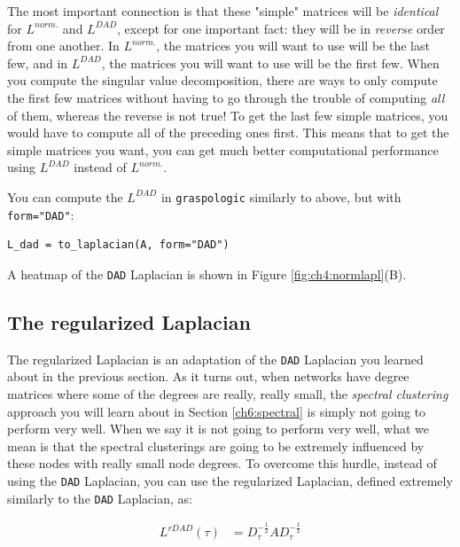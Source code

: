 The most important connection is that these "simple" matrices will be \emph{identical} for $L^{norm.}$ and $L^{DAD}$, except for one important fact: they will be in \emph{reverse} order from one another. In $L^{norm.}$, the matrices you will want to use will be the last few, and in $L^{DAD}$, the matrices you will want to use will be the first few. When you compute the singular value decomposition, there are ways to only compute the first few matrices without having to go through the trouble of computing \emph{all} of them, whereas the reverse is not true! To get the last few simple matrices, you would have to compute all of the preceding ones first. This means that to get the simple matrices you want, you can get much better computational performance using $L^{DAD}$ instead of $L^{norm.}$.

You can compute the $L^{DAD}$ in \texttt{graspologic} similarly to above, but with \texttt{form="DAD"}:

\begin{lstlisting}[style=python]
L_dad = to_laplacian(A, form="DAD")
\end{lstlisting}

A heatmap of the \texttt{DAD} Laplacian is shown in Figure \ref{fig:ch4:normlapl}(B).

\subsection{The regularized Laplacian}
\label{ch4:mtx-rep:reg_laplacian}
The regularized Laplacian is an adaptation of the \texttt{DAD} Laplacian you learned about in the previous section. As it turns out, when networks have degree matrices where some of the degrees are really, really small, the \emph{spectral clustering} approach you will learn about in Section \ref{ch6:spectral} is simply not going to perform very well. When we say it is not going to perform very well, what we mean is that the spectral clusterings are going to be extremely influenced by these nodes with really small node degrees. To overcome this hurdle, instead of using the \texttt{DAD} Laplacian, you can use the regularized Laplacian, defined extremely similarly to the \texttt{DAD} Laplacian, as:

\begin{align*}
    L^{rDAD}(\tau) &= D_\tau^{-\frac{1}{2}}A D_\tau^{-\frac{1}{2}}
\end{align*}

